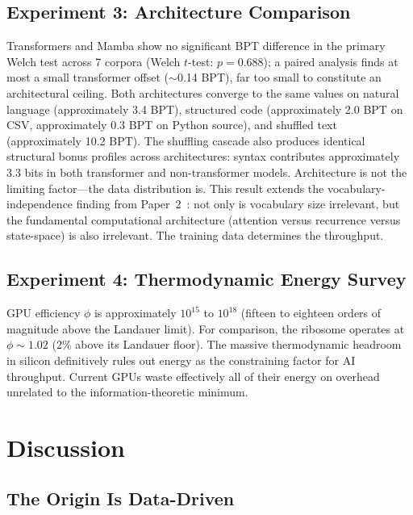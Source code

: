 \documentclass[11pt]{article}
\begin{document}
\subsection{Experiment 3: Architecture Comparison}

Transformers and Mamba show no significant BPT difference in the primary Welch test across 7 corpora (Welch $t$-test: $p = 0.688$); a paired analysis finds at most a small transformer offset ($\sim$0.14 BPT), far too small to constitute an architectural ceiling. Both architectures converge to the same values on natural language (approximately 3.4 BPT), structured code (approximately 2.0 BPT on CSV, approximately 0.3 BPT on Python source), and shuffled text (approximately 10.2 BPT). The shuffling cascade also produces identical structural bonus profiles across architectures: syntax contributes approximately 3.3 bits in both transformer and non-transformer models. Architecture is not the limiting factor---the data distribution is. This result extends the vocabulary-independence finding from Paper~2~\cite{whitmer2026floor}: not only is vocabulary size irrelevant, but the fundamental computational architecture (attention versus recurrence versus state-space) is also irrelevant. The training data determines the throughput.

\subsection{Experiment 4: Thermodynamic Energy Survey}

GPU efficiency $\phi$ is approximately $10^{15}$ to $10^{18}$ (fifteen to eighteen orders of magnitude above the Landauer limit). For comparison, the ribosome operates at $\phi \sim 1.02$ (2\% above its Landauer floor). The massive thermodynamic headroom in silicon definitively rules out energy as the constraining factor for AI throughput. Current GPUs waste effectively all of their energy on overhead unrelated to the information-theoretic minimum.

\section{Discussion}

\subsection{The Origin Is Data-Driven}
\end{document}
